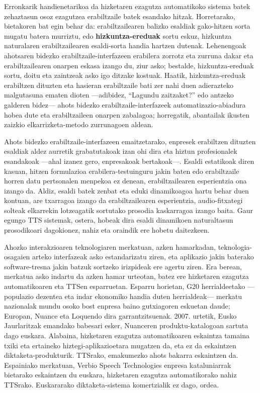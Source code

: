 \begin{multicols}{2}
\begin{itemize}
    \end{itemize}


  Erronkarik handienetarikoa da hizketaren ezagutza automatikoko sistema batek zehaztasun osoz ezagutzea erabiltzaile batek esandako hitzak. Horretarako, bietakoren bat egin behar da: erabiltzailearen balizko esaldiak gako-hitzen sorta mugatu batera murriztu, edo \textbf{hizkuntza-ereduak} sortu eskuz, hizkuntza naturalaren erabiltzailearen esaldi-sorta handia hartzen dutenak. Lehenengoak ahotsaren bidezko erabiltzaile-interfazeen erabilera zorrotz eta zurruna dakar eta erabiltzailearen onarpen eskasa izango du, ziur asko; bestalde, hizkuntza-ereduak sortu, doitu eta zaintzeak asko igo ditzake kostuak. Haatik, hizkuntza-ereduak erabiltzen dituzten eta hasieran erabiltzaile bati zer nahi duen adierazteko malgutasuna ematen dioten —adibidez, “Lagundu zaitzaket?” edo antzeko galderen bidez— ahots bidezko erabiltzaile-interfazeek automatizazio-abiadura hobea dute eta erabiltzaileen onarpen zabalagoa; horregatik, abantailak ikusten zaizkio elkarrizketa-metodo zurrunagoen aldean.


Ahots bidezko erabiltzaile-interfazeen emaitzetarako, enpresek erabiltzen dituzten esaldiak aldez aurretik grabatutakoak izan ohi dira eta hiztun profesionalek esandakoak —ahal izanez gero, enpresakoak bertakoak—. Esaldi estatikoak diren kasuan, hitzen formulazioa erabilera-testuinguru jakin baten edo erabiltzaile horren datu pertsonalen menpekoa ez denean, erabiltzailearen esperientzia ona izango da. Aldiz, esaldi batek zenbat eta eduki dinamikoagoa hartu behar duen kontuan, are txarragoa izango da erabiltzailearen esperientzia,  audio-fitxategi solteak elkarrekin lotzeagatik sortutako prosodia kaskarragoa izango baita. Gaur egungo TTS sistemak, ostera, hobeak dira esaldi dinamikoen naturaltasun prosodikoari dagokionez, nahiz eta oraindik ere hobetu daitezkeen. 

Ahozko interakzioaren teknologiaren merkatuan, azken hamarkadan, teknologia-osagaien arteko interfazeak asko estandarizatu ziren, eta aplikazio jakin baterako software-tresna jakin batzuk sortzeko irizpideak ere agertu ziren. Era berean, merkatua asko indartu da azken hamar urteotan, batez ere hizketaren ezagutza automatikoaren eta TTSen esparruetan. Esparru horietan, G20 herrialdeetako —populazio dezentea eta indar ekonomiko handia duten herrialdeak— merkatu nazionalak mundu osoko bost enpresa baino gutxiagoren eskuetan daude; Europan, Nuance eta Loquendo dira garrantzitsuenak. 2007. urtetik, Eusko Jaurlaritzak emandako babesari esker, Nuanceren produktu-katalogoan sartuta dago euskara. Alabaina, hizketaren ezagutza automatikoaren eskaintza tamaina txiki eta ertaineko hiztegi-aplikazioetara mugatzen da, eta ez da eskaintzen diktaketa-produkturik. TTSrako, emakumezko ahots bakarra eskaintzen da. Espainiako merkatuan, Verbio Speech Technologies \cite{BAS-Nota29}  enpresa kataluniarrak bietarako eskaintzen du euskara, hizketaren ezagutza automatikorako nahiz TTSrako. Euskararako diktaketa-sistema komertzialik ez dago, ordea. 


\end{multicols}
